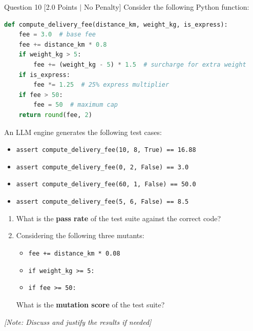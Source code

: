 \documentclass[11pt,a4paper]{article}
\begin{document}
\newpage

\begin{questionbox}{Question 10 \hfill [2.0 Points $\vert$ No Penalty]}
Consider the following Python function:

\begin{lstlisting}[language=Python]
def compute_delivery_fee(distance_km, weight_kg, is_express):
    fee = 3.0  # base fee
    fee += distance_km * 0.8
    if weight_kg > 5:
        fee += (weight_kg - 5) * 1.5  # surcharge for extra weight
    if is_express:
        fee *= 1.25  # 25% express multiplier
    if fee > 50:
        fee = 50  # maximum cap
    return round(fee, 2)
\end{lstlisting}

An LLM engine generates the following test cases:
\begin{itemize}[leftmargin=1.5cm,itemsep=1pt]
    \item[\textbf{T1:}] \texttt{assert compute\_delivery\_fee(10, 8, True) == 16.88}
    \item[\textbf{T2:}] \texttt{assert compute\_delivery\_fee(0, 2, False) == 3.0}
    \item[\textbf{T3:}] \texttt{assert compute\_delivery\_fee(60, 1, False) == 50.0}
    \item[\textbf{T4:}] \texttt{assert compute\_delivery\_fee(5, 6, False) == 8.5}
\end{itemize}

\begin{enumerate}[label=\textbf{\alph*)},leftmargin=1.2cm,itemsep=2pt]
    \item What is the \textbf{pass rate} of the test suite against the correct code?
    \item Considering the following three mutants:
    \begin{itemize}[itemsep=1pt]
        \item[\textbf{Line 5:}] \texttt{fee += distance\_km * 0.08}
        \item[\textbf{Line 7:}] \texttt{if weight\_kg >= 5:}
        \item[\textbf{Line 10:}] \texttt{if fee >= 50:}
    \end{itemize}
    What is the \textbf{mutation score} of the test suite?
\end{enumerate}
\textit{[Note: Discuss and justify the results if needed]}
\end{questionbox}

\newpage
\end{document}
